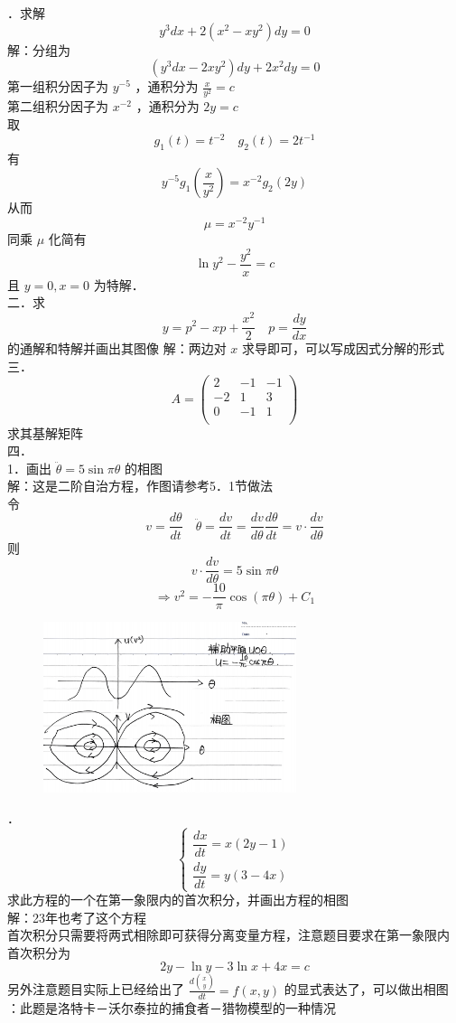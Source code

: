 \documentclass[UTF8]{ctexart}
\begin{document}
．求解 $$y^{3} d x+2\left(x^{2}-x y^{2}\right) d y=0$$
解：分组为 
$$\left(y^{3} d x-2 x y^{2}\right) d y+2 x^{2} d y=0$$
第一组积分因子为 $y^{-5}$ ，通积分为 $\frac{x}{y^{2}}=c$\\
第二组积分因子为 $x^{-2}$ ，通积分为 $2 y=c$\\
取 $$g_{1}(t)=t^{-2}\quad g_{2}(t)=2 t^{-1}$$ 
有 $$y^{-5} g_{1}\left(\frac{x}{y^{2}}\right)=x^{-2} g_{2}(2 y)$$ 
从而 
$$\mu=x^{-2} y^{-1}$$
同乘 $\mu$ 化简有 $$\ln y^{2}-\frac{y^{2}}{x}=c$$ 且 $y=0, x=0$ 为特解．\\


\noindent  二．求
$$
y=p^2-xp+\frac{x^2}{2} \quad p=\frac{dy}{dx}
$$
的通解和特解并画出其图像
解：两边对 $x$ 求导即可，可以写成因式分解的形式\\


\noindent 三．
\[
A=
\begin{pmatrix}
	2 & -1 & -1 \\
	-2 & 1 & 3 \\
	0 &-1 & 1 \\
\end{pmatrix}
\]
求其基解矩阵\\


\noindent 四．\\
1．画出 $\ddot{\theta}=5 \sin \pi \theta$ 的相图\\
解：这是二阶自治方程，作图请参考5．1节做法\\
令 $$v=\frac{d \theta}{d t} \quad \ddot{\theta}=\frac{d v}{d t}=\frac{d v}{d \theta} \frac{d \theta}{d t}=v \cdot \frac{d v}{d \theta}$$
则
$$v \cdot \frac{d v}{d \theta}=5 \sin \pi \theta$$
$$\Rightarrow v^{2}=-\frac{10}{\pi} \cos (\pi \theta)+C_{1}$$

\begin{figure}[h]  
	\centering  
	\includegraphics[height=5cm]{24期末.png} 
\end{figure}


．
\[
\begin{cases}
	\dfrac{d x}{d t}=x(2 y-1) \\ 
	\dfrac{d y}{d t}=y(3-4 x)
\end{cases}
\]
求此方程的一个在第一象限内的首次积分，并画出方程的相图\\
解：23年也考了这个方程\\
首次积分只需要将两式相除即可获得分离变量方程，注意题目要求在第一象限内\\
首次积分为 $$2 y-\ln y-3 \ln x+4 x=c$$
另外注意题目实际上已经给出了 $\frac{d\binom{x}{y}}{d t}=f(x, y)$ 的显式表达了，可以做出相图
：此题是洛特卡－沃尔泰拉的捕食者－猎物模型的一种情况\\
\end{document}
